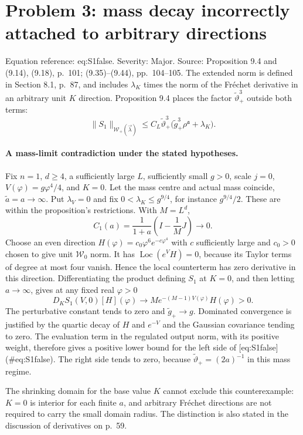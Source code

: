 \documentclass[10pt]{article}
\begin{document}
\section*{Problem 3: mass decay incorrectly attached to arbitrary directions}
Equation reference: eq:S1false. Severity: Major. Source: Proposition 9.4 and (9.14), (9.18), p. 101; (9.35)–(9.44), pp. 104–105. The extended norm is defined in Section 8.1, p. 87, and includes \(\lambda_K\) times the norm of the Fréchet derivative in an arbitrary unit \(K\) direction. Proposition 9.4 places the factor \(\widetilde\vartheta_+^3\) outside both terms: \[
 \|S_1\|_{\mathcal W_+(\vec\lambda)}
 \leq C_L\widetilde\vartheta_+^3
           \bigl(\widetilde g_+^3\rho^{\mathfrak a}+\lambda_K\bigr).\]\par
\paragraph*{A mass-limit contradiction under the stated hypotheses.}\mbox{}\par
Fix \(n=1\), \(d\geq4\), a sufficiently large \(L\), sufficiently small \(g>0\), scale \(j=0\), \(V(\varphi)=g\varphi^4/4\), and \(K=0\). Let the mass centre and actual mass coincide, \(\widetilde a=a\to\infty\). Put \(\lambda_V=0\) and fix \(0<\lambda_K\leq g^{9/4}\), for instance \(g^{9/4}/2\). These are within the proposition’s restrictions. With \(M=L^d\), \[C_1(a)=\frac1{1+a}\left(I-\frac1M J\right)\longrightarrow0 .\] Choose an even direction \(H(\varphi)=c_0\varphi^6e^{-c\varphi^4}\) with \(c\) sufficiently large and \(c_0>0\) chosen to give unit \(\mathcal W_0\) norm. It has \(\operatorname{Loc}(e^V H)=0\), because its Taylor terms of degree at most four vanish. Hence the local counterterm has zero derivative in this direction. Differentiating the product defining \(S_1\) at \(K=0\), and then letting \(a\to\infty\), gives at any fixed real \(\varphi>0\) \[D_KS_1(V,0)[H](\varphi)
 \longrightarrow M e^{-(M-1)V(\varphi)}H(\varphi)>0 .\] The perturbative constant tends to zero and \(\widetilde g_+\to g\). Dominated convergence is justified by the quartic decay of \(H\) and \(e^{-V}\) and the Gaussian covariance tending to zero. The evaluation term in the regulated output norm, with its positive weight, therefore gives a positive lower bound for the left side of [eq:S1false] (\#eq:S1false). The right side tends to zero, because \(\widetilde\vartheta_+=(2a)^{-1}\) in this mass regime.\par
The shrinking domain for the base value \(K\) cannot exclude this counterexample: \(K=0\) is interior for each finite \(a\), and arbitrary Fréchet directions are not required to carry the small domain radius. The distinction is also stated in the discussion of derivatives on p. 59.\par
\end{document}
